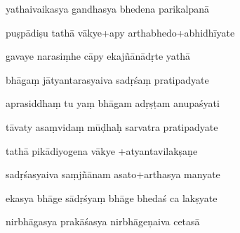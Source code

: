 \documentclass[article,12pt,a4paper]{memoir}%
\newcounter{parCount}
\begin{document}
	  
	  \pstart {} yathaivaikasya gandhasya bhedena parikalpanā 
	{}
	\pend%
      

	  
	  \pstart \leavevmode%
	puṣpādiṣu tathā vākye+apy arthabhedo+abhidhīyate 
	{}
	\pend%
      

	  
	  \pstart {} gavaye narasiṃhe cāpy ekajñānādṛte yathā 
	{}
	\pend%
      

	  
	  \pstart \leavevmode%
	bhāgaṃ jātyantarasyaiva sadṛśaṃ pratipadyate 
	{}
	\pend%
      

	  
	  \pstart {} aprasiddhaṃ tu yaṃ bhāgam adṛṣṭam anupaśyati 
	{}
	\pend%
      

	  
	  \pstart \leavevmode%
	tāvaty asaṃvidaṃ mūḍhaḥ sarvatra pratipadyate 
	{}
	\pend%
      

	  
	  \pstart {} tathā pikādiyogena vākye +atyantavilakṣaṇe 
	{}
	\pend%
      

	  
	  \pstart \leavevmode%
	sadṛśasyaiva saṃjñānam asato+arthasya manyate 
	{}
	\pend%
      

	  
	  \pstart {} ekasya bhāge sādṛśyaṃ bhāge bhedaś ca lakṣyate 
	{}
	\pend%
      

	  
	  \pstart \leavevmode%
	nirbhāgasya prakāśasya nirbhāgeṇaiva cetasā 
	{}
	\pend%
      
\end{document}
